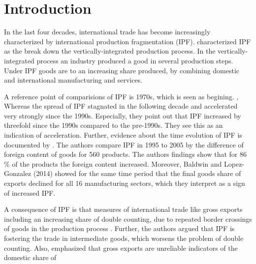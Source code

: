 \chapter{Introduction}
\label{cha:Intro}
In the last four decades, international trade has become increasingly characterized by international production fragmentation (IPF).
\textcite{feenstra98} characterized IPF as the break down the vertically-integrated production process.
In the vertically-integrated process an industry produced a good in several production steps.
Under IPF goods are to an increasing share produced, by combining domestic and international manufacturing and services.  \par
A reference point of comparisions of IPF is 1970s, which is seen as begining. ,
Whereas the spread of IPF stagnated in the following decade and accelerated very strongly since the 1990s.
Especially, they point out that IPF increased by threefold since the 1990s compared to the pre-1990s.
They see this as an indication of acceleration.
Further, evidence about the time evolution of IPF is documented by \textcite{timmer_gvc}. The authors compare IPF in 1995 to 2005 by the difference of foreign content of goods for 560 products.
The authors findings show that for 86 \% of the products the foreign content increased.
Moreover, Baldwin and Lopez-Gonzalez (2014) showed for the same time period that the final goods share of exports declined for all 16 manufacturing sectors, which they interpret as a sign of increased IPF.
\par %
A consequence of IPF is that measures of international trade like gross exports including an increasing share of double counting, due to repeated border crossings of goods in the production process \parencite{feenstra98}.
Further, the authors argued that IPF is fostering the trade in intermediate goods, which worsens the problem of double counting.
Also, \textcite{johnson}  emphasized that gross exports are unreliable indicators of the domestic share of
